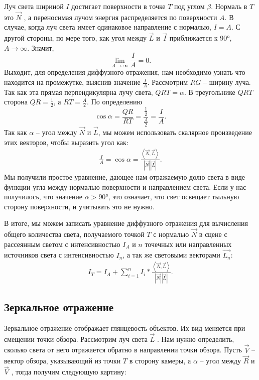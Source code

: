 Луч света шириной $I$ достигает поверхности в точке $T$ под углом $\beta$. Нормаль в $T$ это $\vec{N}$ , а переносимая лучом энергия распределяется по поверхности $A$. В случае, когда луч света имеет одинаковое направление с нормалью, $I=A$. С другой стороны, по мере того, как угол между $\vec{L}$ и $\vec{I}$ приближается к 90°, $A\to\infty$. Значит,
\begin{equation}
\lim_{A\to\infty} \frac{I}{A} = 0.
\end{equation}
Выходит, для определения диффузного отражения, нам необходимо узнать что находится на промежутке, выяснив значение $\frac{I}{A}$. Рассмотрим $RG$ – ширину луча. Так как эта прямая перпендикулярна лучу
света, $QRT = \alpha$. В треугольнике $QRT$ сторона $QR=\frac{1}{2}$, а $RT=\frac{A}{2}$. По определению
\begin{equation}
\cos{\alpha}=\frac{QR}{RT}=\frac{\frac{1}{2}}{\frac{A}{2}}=\frac{I}{A}.
\end{equation}
Так как $\alpha$ – угол между $\vec{N}$ и $\vec{L}$, мы можем использовать скалярное произведение этих векторов, чтобы выразить угол как:
\begin{gather}
	\frac{I}{A}=\cos{\alpha}=\frac{\left\langle{\vec{N}, \vec{L}}\right\rangle}{\left| {\vec{N}} \right| \left| {\vec{L}} \right|}.
\end{gather}
Мы получили простое уравнение, дающее нам отражаемую долю света в виде функции угла между нормалью поверхности и направлением света. Если у нас получилось, что значение $\alpha > 90°$, это означает, что свет освещает тыльную сторону поверхности, и учитывать это не нужно.

В итоге, мы можем записать уравнение диффузного отражения для вычисления общего количества света, получаемого точкой $T$ с нормалью $\vec{N}$ в сцене с рассеянным светом с интенсивностью $I_{A}$ и $n$ точечных или направленных источников света с интенсивностью $I_{n}$, а так же световыми векторами $\vec{L_{n}}$:
\begin{gather}
	I_{T} =  I_{A} + \sum_{i=1}^n I_{i}*\frac{\left\langle{\vec{N}, \vec{L}}\right\rangle}{\left| {\vec{N}} \right| \left| {\vec{L}} \right|}.
\end{gather}

\subsection{Зеркальное отражение}

Зеркальное отражение отображает глянцевость объектов. Их вид меняется при смещении точки обзора. Рассмотрим луч света $\vec{L}$ . Нам нужно определить, сколько света от него отражается обратно в направлении точки обзора. Пусть $\vec{V}$ – вектор обзора, указывающий из точки $T$ в сторону камеры, а $\alpha$ – угол между $\vec{R}$ и $\vec{V}$ , тогда получим следующую картину:

